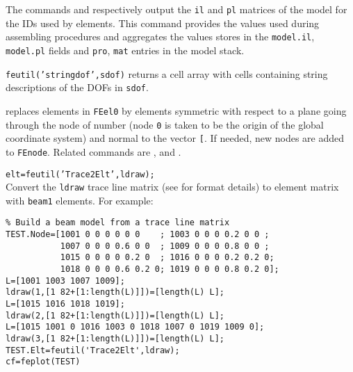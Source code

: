 The commands  and  respectively output the {\tt il} and {\tt pl} matrices of the model for the IDs used by elements. This command provides the values used during assembling procedures and aggregates the values stores in the {\tt model.il}, {\tt model.pl} fields and {\tt pro}, {\tt mat} entries in the model stack.



{\tt feutil('stringdof',sdof)} returns a cell array with cells containing string descriptions of the DOFs in {\tt sdof}.


 replaces elements in {\tt FEel0} by elements symmetric with respect to a plane going through the node of number  (node {\tt 0} is taken to be the origin of the global coordinate system) and normal to the vector {\tt [}\tsi{nx ny nz}{\tt ]}. If needed, new nodes are added to {\tt FEnode}.  
Related commands are ,  and .

{\tt elt=feutil('Trace2Elt',ldraw);}\\
Convert the {\tt ldraw} trace line matrix (see  for format details) to element matrix with {\tt beam1} elements. For example:

\begin{verbatim}
% Build a beam model from a trace line matrix
TEST.Node=[1001 0 0 0 0 0 0    ; 1003 0 0 0 0.2 0 0 ;
           1007 0 0 0 0.6 0 0  ; 1009 0 0 0 0.8 0 0 ;
           1015 0 0 0 0 0.2 0  ; 1016 0 0 0 0.2 0.2 0;
           1018 0 0 0 0.6 0.2 0; 1019 0 0 0 0.8 0.2 0]; 
L=[1001 1003 1007 1009];  
ldraw(1,[1 82+[1:length(L)]])=[length(L) L]; 
L=[1015 1016 1018 1019];
ldraw(2,[1 82+[1:length(L)]])=[length(L) L]; 
L=[1015 1001 0 1016 1003 0 1018 1007 0 1019 1009 0];
ldraw(3,[1 82+[1:length(L)]])=[length(L) L];
TEST.Elt=feutil('Trace2Elt',ldraw);
cf=feplot(TEST)
\end{verbatim}%


